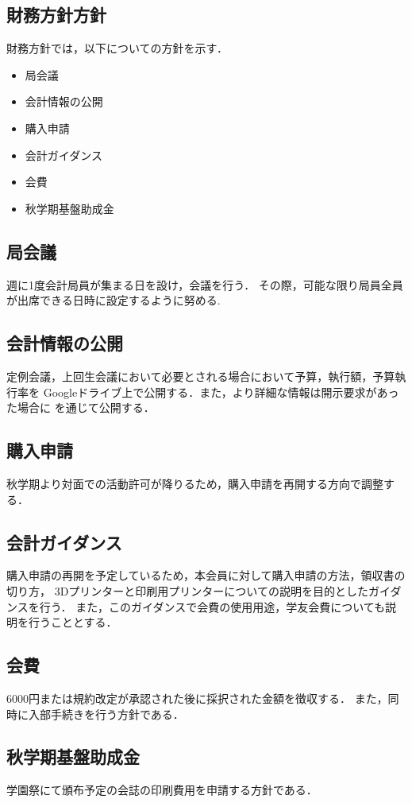\subsection*{財務方針方針}


財務方針では，以下についての方針を示す．
\begin{itemize}
  \item 局会議
  \item 会計情報の公開
  \item 購入申請
  \item 会計ガイダンス
  \item 会費
  \item 秋学期基盤助成金
\end{itemize}

\subsection*{局会議}
週に1度会計局員が集まる日を設け，会議を行う．
その際，可能な限り局員全員が出席できる日時に設定するように努める.

\subsection*{会計情報の公開}
定例会議，上回生会議において必要とされる場合において予算，執行額，予算執行率を
Googleドライブ上で公開する．また，より詳細な情報は開示要求があった場合に\kaikeiStaff{}
を通じて公開する．

\subsection*{購入申請}
秋学期より対面での活動許可が降りるため，購入申請を再開する方向で調整する．

\subsection*{会計ガイダンス}
購入申請の再開を予定しているため，本会員に対して購入申請の方法，領収書の切り方，
3Dプリンターと印刷用プリンターについての説明を目的としたガイダンスを行う．
また，このガイダンスで会費の使用用途，学友会費についても説明を行うこととする．

\subsection*{会費}
6000円または規約改定が承認された後に採択された金額を徴収する．
また，同時に入部手続きを行う方針である．

\subsection*{秋学期基盤助成金}
学園祭にて頒布予定の会誌の印刷費用を申請する方針である．

